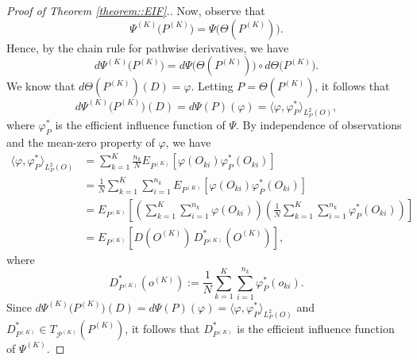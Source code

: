 \documentclass[11pt]{article}
\theoremstyle{plain}
\theoremstyle{definition}
\theoremstyle{remark}
\theoremstyle{definition}
\begin{document}
\begin{proof}[Proof of Theorem \ref{theorem::EIF}.]
Now, observe that 
\[
\Psi^{(K)}\bigl(P^{(K)}\bigr) = \Psi\bigl(\Theta(P^{(K)})\bigr).
\]
Hence, by the chain rule for pathwise derivatives, we have
\[
d\Psi^{(K)}\bigl(P^{(K)}\bigr) = d\Psi\bigl(\Theta(P^{(K)})\bigr) \circ d\Theta\bigl(P^{(K)}\bigr).
\]
We know that \( d\Theta(P^{(K)})(D) = \varphi \). Letting \( P = \Theta(P^{(K)}) \), it follows that
\[
d\Psi^{(K)}\bigl(P^{(K)}\bigr)(D) = d\Psi(P)(\varphi) = \langle \varphi, \varphi^*_P \rangle_{L^2_P(O)},
\]
where \( \varphi^*_P \) is the efficient influence function of \( \Psi \). By independence of observations and the mean-zero property of \( \varphi \), we have
\begin{align*}
    \langle \varphi, \varphi^*_P \rangle_{L^2_P(O)}  &=     \sum_{k=1}^K \frac{n_k}{N} E_{P^{(K)}}\left[ \varphi(O_{ki})  \varphi^*_P(O_{ki})  \right] \\
    &=   \frac{1}{N} \sum_{k=1}^K \sum_{i=1}^{n_k} E_{P^{(K)}}\left[ \varphi(O_{ki})  \varphi^*_P(O_{ki})  \right] \\
    &= E_{P^{(K)}}\left[ \left(   \sum_{k=1}^K \sum_{i=1}^{n_k} \varphi(O_{ki}) \right)
    \left( \frac{1}{N} \sum_{k=1}^K \sum_{i=1}^{n_k} \varphi^*_P(O_{ki}) \right) \right] \\
    &= E_{P^{(K)}}\left[ D(O^{(K)}) \, D^*_{P^{(K)}}(O^{(K)}) \right],
\end{align*}
where
\[
D^*_{P^{(K)}}(o^{(K)}) := \frac{1}{N} \sum_{k=1}^K \sum_{i=1}^{n_k} \varphi^*_P(o_{ki}).
\]
Since \( d\Psi^{(K)}\bigl(P^{(K)}\bigr)(D) = d\Psi(P)(\varphi) = \langle \varphi, \varphi^*_P \rangle_{L^2_P(O)} \) and \( D^*_{P^{(K)}} \in T_{\mathcal{P}^{(K)}}(P^{(K)}) \), it follows that \( D^*_{P^{(K)}} \) is the efficient influence function of \( \Psi^{(K)} \).

     
\end{proof}


 
 
 
\end{document}
